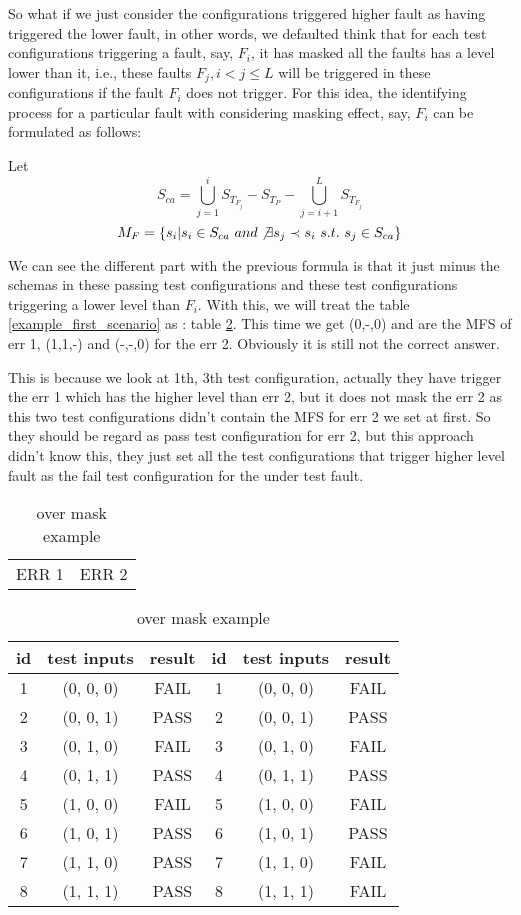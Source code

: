 \documentclass{sig-alternate}
\begin{document}
So what if we just consider the configurations triggered higher fault as having triggered the lower fault, in other words, we defaulted think that for each test configurations triggering a fault, say, $F_{i}$, it has masked all the faults has a level lower than it, i.e., these faults $F_{j}, i < j \leq L $ will be triggered in these configurations if the fault $F_{i}$ does not trigger. For this idea, the identifying process for a particular fault with considering masking effect, say, $F_{i}$ can be formulated as follows:

Let $$S_{ca} =\bigcup_{j = 1}^{i}S_{T_{F_{j}}} - S_{T_{P}} - \bigcup_{j = i+1}^{L}S_{T_{F_{j}}}$$
$$M_{F} = \{s_{i} | s_{i} \in S_{ca}\ and \not\exists s_{j} \prec s_{i}\ s.t.\ s_{j} \in S_{ca} \}$$

We can see the different part with the previous formula is that it just minus the schemas in these passing test configurations and these test configurations triggering a lower level than $F_{i}$. With this, we will treat the table \ref{example_first_scenario} as : table \ref{another_idea_masking}.  This time we get  (0,-,0) and  are the MFS of err 1, (1,1,-) and (-,-,0) for the err 2. Obviously it is still not the correct answer.  

This is because we look at 1th, 3th test configuration, actually they have trigger the err 1 which has the higher level than err 2, but it does not mask the err 2 as this two test configurations didn't contain the MFS for err 2 we set at first. So they should be regard as pass test configuration for err 2, but this approach didn't know this, they just set all the test configurations that trigger higher level fault as the fail test configuration for the under test fault.

\begin{table}
\centering
\caption{over mask example}
\label{another_idea_masking}
\begin{tabular}{p{}|p{}} \hline
   ERR 1 & ERR 2
\end{tabular}

\begin{tabular}{c|c|c|c|c|c} \hline
id &test inputs & result & id&test inputs & result\\ \hline
1 &(0, 0, 0) &  FAIL &1&(0, 0, 0) &  FAIL\\ \hline
2 &(0, 0, 1) &  PASS &2&(0, 0, 1) &  PASS\\ \hline
3 &(0, 1, 0) &  FAIL &3&(0, 1, 0) &  FAIL\\ \hline
4 &(0, 1, 1) &  PASS &4&(0, 1, 1) &  PASS\\ \hline
5 &(1, 0, 0) &  FAIL &5&(1, 0, 0) &  FAIL\\ \hline
6 &(1, 0, 1) &  PASS &6&(1, 0, 1) &  PASS\\ \hline
7 &(1, 1, 0) &  PASS &7&(1, 1, 0) &  FAIL\\ \hline
8 &(1, 1, 1) &  PASS &8&(1, 1, 1) &  FAIL\\ \hline
\hline\end{tabular}
\end{table}
\end{document}
